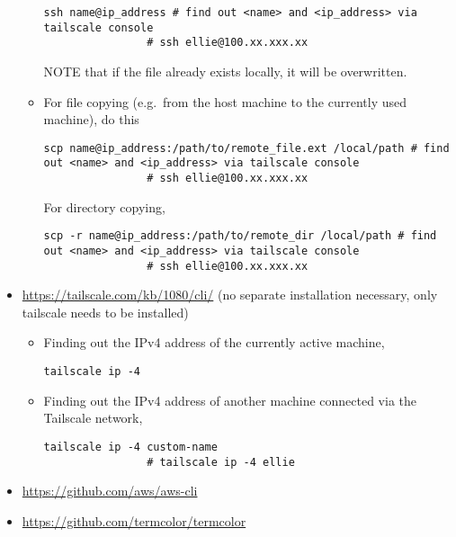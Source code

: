 \documentclass[12pt, a4paper]{article}
\numberwithin{equation}{section}
\theoremstyle{definition}
\theoremstyle{definition}
\begin{document}
\begin{itemize}
\begin{itemize}
			\begin{lstlisting}[style=mystylepython, label=alg:tailscale_connec, xleftmargin=\parindent]
				ssh name@ip_address # find out <name> and <ip_address> via tailscale console
				# ssh ellie@100.xx.xxx.xx
			\end{lstlisting}
		
			NOTE that if the file already exists locally, it will be overwritten.
			
			\item For file copying (e.g.~from the host machine to the currently used machine), do this
			
			\begin{lstlisting}[style=mystylepython, label=alg:tailscale__scp_file, xleftmargin=\parindent]
				scp name@ip_address:/path/to/remote_file.ext /local/path # find out <name> and <ip_address> via tailscale console
				# ssh ellie@100.xx.xxx.xx
			\end{lstlisting}
			
			For directory copying, 
			
			\begin{lstlisting}[style=mystylepython, label=alg:tailscale__scp_dir, xleftmargin=\parindent]
				scp -r name@ip_address:/path/to/remote_dir /local/path # find out <name> and <ip_address> via tailscale console
				# ssh ellie@100.xx.xxx.xx
			\end{lstlisting}
			
		\end{itemize}
	
		\item \url{https://tailscale.com/kb/1080/cli/} (no separate installation necessary, only tailscale needs to be installed)
		
		\begin{itemize}
			\item Finding out the IPv4 address of the currently active machine,
			
			\begin{lstlisting}[style=mystylepython, label=alg:tailscale_ip, xleftmargin=\parindent]
				tailscale ip -4 
			\end{lstlisting}
			
			\item Finding out the IPv4 address of another machine connected via the Tailscale network,
			
			\begin{lstlisting}[style=mystylepython, label=alg:tailscale_ip, xleftmargin=\parindent]
				tailscale ip -4 custom-name
				# tailscale ip -4 ellie
			\end{lstlisting}
			
		\end{itemize}
		
		\item \url{https://github.com/aws/aws-cli}
		
		\item \url{https://github.com/termcolor/termcolor}
		
	\end{itemize}
\end{document}
